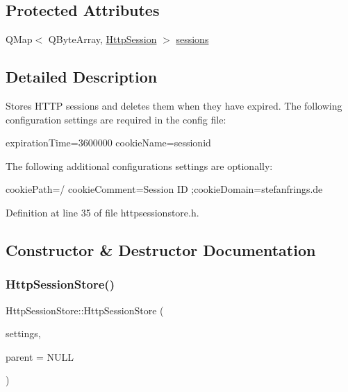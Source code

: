 \subsection*{Protected Attributes}
\begin{DoxyCompactItemize}
\item 
Q\+Map$<$ Q\+Byte\+Array, \mbox{\hyperlink{classstefanfrings_1_1_http_session}{Http\+Session}} $>$ \mbox{\hyperlink{classstefanfrings_1_1_http_session_store_a25bcdad5accd436881927a414b99ba22}{sessions}}
\end{DoxyCompactItemize}


\subsection{Detailed Description}
Stores H\+T\+TP sessions and deletes them when they have expired. The following configuration settings are required in the config file\+: {\ttfamily 
\begin{DoxyPre}
expirationTime=3600000
cookieName=sessionid
\end{DoxyPre}
} The following additional configurations settings are optionally\+: {\ttfamily 
\begin{DoxyPre}
cookiePath=/
cookieComment=Session ID
;cookieDomain=stefanfrings.de
\end{DoxyPre}
} 

Definition at line 35 of file httpsessionstore.\+h.



\subsection{Constructor \& Destructor Documentation}
\mbox{\label{classstefanfrings_1_1_http_session_store_a4404d037bc389162148b66b8392580c6}} 
\subsubsection{\texorpdfstring{Http\+Session\+Store()}{HttpSessionStore()}}
{\footnotesize\ttfamily Http\+Session\+Store\+::\+Http\+Session\+Store (\begin{DoxyParamCaption}\item[{Q\+Settings $\ast$}]{settings,  }\item[{Q\+Object $\ast$}]{parent = {\ttfamily NULL} }\end{DoxyParamCaption})}

